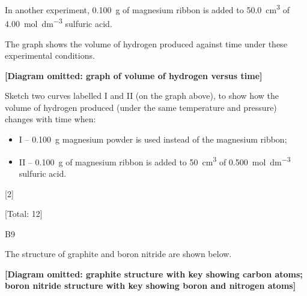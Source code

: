 \documentclass[11pt]{exam}
\makeatletter
\renewcommand{\dotfill}{%
  \leavevmode\cleaders\hb@xt@ 3pt{\hss.\hss}\hfill\kern\z@
}
\makeatother
\begin{document}
\begin{questions}
\begin{parts}
\begin{subparts}
\subpart[2] In another experiment, \qty{0.100}{\g} of magnesium ribbon is added to \qty{50.0}{\cm\cubed} of \qty{4.00}{\mol\per\dm\cubed} sulfuric acid.

The graph shows the volume of hydrogen produced against time under these experimental conditions.

\textbf{[Diagram omitted: graph of volume of hydrogen versus time]}

Sketch two curves labelled I and II (on the graph above), to show how the volume of hydrogen produced (under the same temperature and pressure) changes with time when:
\begin{itemize}
\item I -- \qty{0.100}{\g} magnesium powder is used instead of the magnesium ribbon;
\item II -- \qty{0.100}{\g} of magnesium ribbon is added to \qty{50}{\cm\cubed} of \qty{0.500}{\mol\per\dm\cubed} sulfuric acid.
\end{itemize}
\hfill [2]
\end{subparts}

\end{parts}

\vfill
\hfill [Total: 12]

\newpage

\question B9

The structure of graphite and boron nitride are shown below.

\textbf{[Diagram omitted: graphite structure with key showing carbon atoms; boron nitride structure with key showing boron and nitrogen atoms]}

\end{questions}
\end{document}
